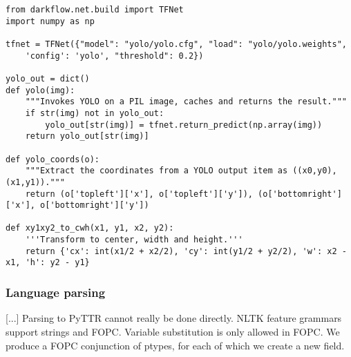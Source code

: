 \begin{lstlisting}[label=lst:yolo, caption=Invoking YOLO]
from darkflow.net.build import TFNet
import numpy as np

tfnet = TFNet({"model": "yolo/yolo.cfg", "load": "yolo/yolo.weights",
    'config': 'yolo', "threshold": 0.2})

yolo_out = dict()
def yolo(img):
    """Invokes YOLO on a PIL image, caches and returns the result."""
    if str(img) not in yolo_out:
        yolo_out[str(img)] = tfnet.return_predict(np.array(img))
    return yolo_out[str(img)]

def yolo_coords(o):
    """Extract the coordinates from a YOLO output item as ((x0,y0), (x1,y1))."""
    return (o['topleft']['x'], o['topleft']['y']), (o['bottomright']['x'], o['bottomright']['y'])

def xy1xy2_to_cwh(x1, y1, x2, y2):
    '''Transform to center, width and height.'''
    return {'cx': int(x1/2 + x2/2), 'cy': int(y1/2 + y2/2), 'w': x2 - x1, 'h': y2 - y1}
\end{lstlisting}



\subsubsection{Language parsing}

[...]
 Parsing to PyTTR cannot really be done directly. NLTK feature grammars support strings and FOPC. Variable substitution is only allowed in FOPC. We produce a FOPC conjunction of ptypes, for each of which we create a new field.


